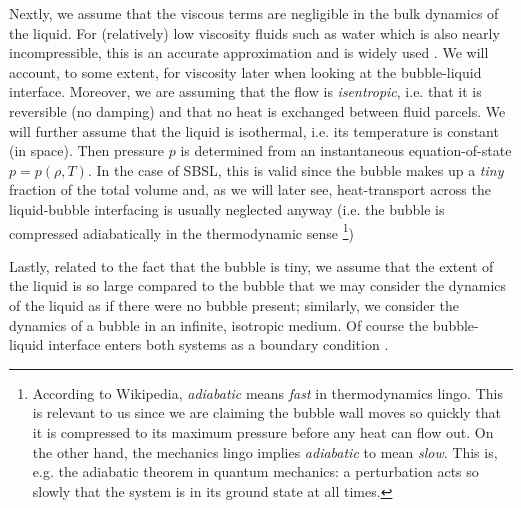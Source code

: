 \documentclass[rmp,aps,nofootinbib,superscriptaddress,floatfix]{revtex4-2}
\begin{document}
Nextly, we assume that the viscous terms are negligible in the bulk dynamics of the liquid. For (relatively) low viscosity fluids such as water which is also nearly incompressible, this is an accurate approximation and is widely used \cite{prosperetti1986bubble,prosperetti1999old,brenner2002single,plesset1977bubble}.  We will account, to some extent, for viscosity later when looking at the bubble-liquid interface. Moreover, we are assuming that the flow is \emph{isentropic}, i.e. that it is reversible (no damping) and that no heat is exchanged between fluid parcels. We will further assume that the liquid is isothermal, i.e. its temperature is constant (in space). Then pressure $p$ is determined from an instantaneous equation-of-state $p=p(\rho,T)$. In the case of SBSL, this is valid since the bubble makes up a \emph{tiny} fraction of the total volume and, as we will later see, heat-transport across the liquid-bubble interfacing is usually neglected anyway (i.e. the bubble is compressed adiabatically in the thermodynamic sense \footnote{According to Wikipedia, \emph{adiabatic} means \emph{fast} in thermodynamics lingo. This is relevant to us since we are claiming the bubble wall moves so quickly that it is compressed to its maximum pressure before any heat can flow out. On the other hand, the mechanics lingo implies \emph{adiabatic} to mean \emph{slow}. This is, e.g. the adiabatic theorem in quantum mechanics: a perturbation acts so slowly that the system is in its ground state at all times.})

Lastly, related to the fact that the bubble is tiny, we assume that the extent of the liquid is so large compared to the bubble that we may consider the dynamics of the liquid as if there were no bubble present; similarly, we consider the dynamics of a bubble in an infinite, isotropic medium. Of course the bubble-liquid interface enters both systems as a boundary condition \cite{prosperetti1986bubble}. 
\end{document}
